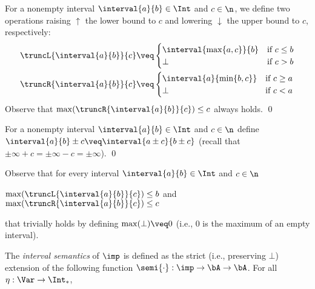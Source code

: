 \begin{definition}
  \label{de:trunc}
  For a nonempty interval \(\interval{a}{b} \in \Int\) and \(c \in \n\), we define
  two operations raising \(\uparrow\) the lower bound to \(c\) and lowering \(\downarrow\) the upper
  bound to \(c\), respectively:
  \begin{align*}
    &\truncL{\interval{a}{b}}{c} \veq 
      \begin{cases} 
        \interval{\max\{a,c\}}{b} & \text{if } c\leq b\\
        \bot & \text{if } c > b
      \end{cases}
    \\
    &\truncR{\interval{a}{b}}{c} \veq 
      \begin{cases}   
        \interval{a}{\min\{b,c\}} & \text{if } c\geq a\\
        \bot & \text{if } c < a 
      \end{cases} 
  \end{align*}
  Observe that \(\max(\truncR{\interval{a}{b}}{c})\leq c\) always holds. \qed   
\end{definition}

\begin{definition}
  \label{de:add}
  For a nonempty interval \(\interval{a}{b} \in \Int\) and \(c \in \n\) define
  \(\interval{a}{b} \pm c \veq \interval{a\pm c}{b\pm c}\) (recall that \(\pm \infty + c = \pm\infty - c = \pm\infty\)).  
  \qed
\end{definition}


Observe that for every interval \(\interval{a}{b} \in \Int\) and
\(c \in \n\)
\begin{center}
  \(\max(\truncL{\interval{a}{b}}{c}) \leq b\)
  \qquad and \qquad
  \(\max(\truncR{\interval{a}{b}}{c}) \leq c\)
\end{center}
that trivially holds by 
defining \(\max (\bot)  \veq 0\) (i.e., \(0\) is the maximum of
an empty interval).

The \emph{interval semantics} of \(\imp\) is defined as the strict
(i.e., preserving \(\bot\))
extension of the following function \(\semi{\cdot}: \imp \to
\bA \to \bA\). For all \(\eta: \Var \to \Int_*\),

